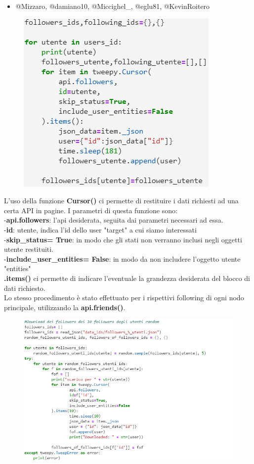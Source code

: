 \documentclass[a4paper,11pt]{report}
\begin{document}
\begin{itemize}
	\item @Mizzaro, @damiano10, @Miccighel\_, @eglu81, @KevinRoitero
\end{itemize}

\begin{figure}[h]
	\centering
	\includegraphics[width=0.4\linewidth]{followers}
	\label{fig:followers}
\end{figure}



\setlength{\parindent}{0pt}
L'uso della funzione \textbf{Cursor()} ci permette di restituire i dati richiesti ad una certa API in pagine. I parametri di questa funzione sono: \\
-\textbf{api.followers}: l'api desiderata, seguita dai parametri necessari ad essa.\\
-\textbf{id}: utente, indica l'id dello user "target" a cui siamo interessati\\
-\textbf{skip\_status= True}: in modo che gli stati non verranno inclusi negli oggetti utente restituiti.\\
-\textbf{include\_user\_entities= False}: in modo da non includere l'oggetto utente "entities"\\
\textbf{.items()} ci permette di indicare l'eventuale la grandezza desiderata del blocco di dati richiesto.\\ \medskip
Lo stesso procedimento è stato effettuato per i rispettivi following di ogni nodo principale, utilizzando la \textbf{api.friends()}.


\begin{figure}[h]
	\centering
	\includegraphics[width=0.8\linewidth]{random_followers}
	\label{fig:followers}
\end{figure}
\end{document}

